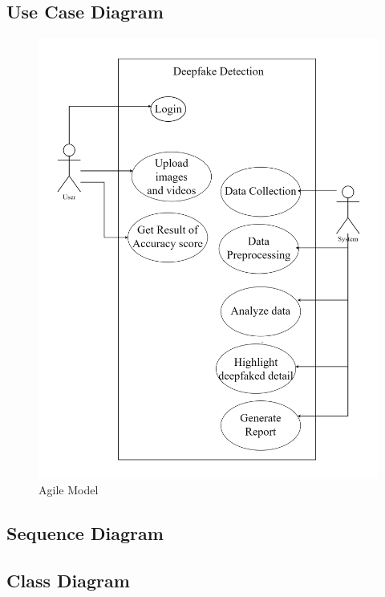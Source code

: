 \documentclass[12 pt]{article}
\begin{document}
\subsection{Use Case Diagram}
\begin{figure}[h]
    \centering
    \includegraphics[width= 5in ]{usecasediagram.drawio.png}
    \caption{Agile Model}
\end{figure}
\newpage
\subsection{Sequence Diagram}
\newpage
\subsection{Class Diagram}
\newpage
\end{document}
